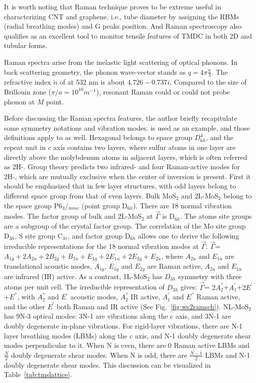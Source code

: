 It is worth noting that Raman technique proves to be extreme useful in characterizing CNT and graphene, i.e., tube diameter by assigning the RBMs (radial breathing modes) and G peaks position.\cite{Bonaccorso2013} And Raman spectroscopy also qualifies as an excellent tool to monitor tensile features of TMDC in both 2D and tubular forms.\cite{Tang2013} 

Raman spectra arise from the inelastic light scattering of optical phonons. In back scattering geometry, the phonon wave-vector stands as $q = 4\pi\frac{n}{\lambda}$. The refractive index $\tilde{n}$ of  at 532 nm is about $4.726 - 0.737i$. Compared to the size of Brillouin zone ($\pi/a = 10^{10}m^{-1}$), resonant Raman could or could not probe phonon at $M$ point.

Before discussing the Raman spectra features, the author briefly recapitulate some symmetry notations and vibration modes.  is used as an example, and those definitions apply to  as well. Hexagonal  belongs to space group $D_{6h}^4$, and the repeat unit in $c$ axis contains two layers, where sulfur atoms in one layer are directly above the molybdenum atoms in adjacent layers, which is often referred as 2H-. Group theory predicts two infrared- and four Raman-active modes for 2H-, which are mutually exclusive when the center of inversion is present. First it should be emphasized that in few layer structures,  with odd layers belong to different space group from that of even layers. Bulk MoS$_2$ and 2L-MoS$_2$ belong to the space group P6$_3$/$_{mmc}$ (point group D$_{6h}$). There are 18 normal vibration modes. The factor group of bulk and 2L-MoS$_2$ at $\vec{\Gamma}$ is D$_{6h}$. The atoms site groups are a subgroup of the crystal factor group. The correlation of the Mo site group D$_{3h}$, S site group C$_{3v}$, and factor group D$_{6h}$ allows one to derive the following irreducible representations for the 18 normal vibration modes at $\vec{\Gamma}$: $\vec{\Gamma}$= $A_{1g}+2A_{2u}+2B_{2g}+B_{1u}+E_{1g}+2E_{1u}+2E_{2g}+E_{2u}$, where $A_{2u}$ and $E_{1u}$ are translational acoustic modes, $A_{1g}$, $E_{1g}$ and $E_{2g}$ are Raman active, $A_{2u}$ and $E_{1u}$ are infrared (IR) active. As a contrast, 1L-MoS$_2$ has $D_{3h}$ symmetry with three atoms per unit cell. The irreducible representation of $D_{3h}$ gives: $\vec{\Gamma}$= $2A_2^{''}$+$A_1^{'}$+$2E^{'}$+$E^{''}$, with $A_2^{''}$ and $E^{'}$ acoustic modes, $A_2^{''}$ IR active, $A_1^{'}$ and $E^{''}$ Raman active, and the other $E^{'}$ both Raman and IR active (See Fig.~\ref{fig:ws2ramsch}). NL-MoS$_2$ has 9N-3 optical modes: 3N-1 are vibrations along the c axis, and 3N-1 are doubly degenerate in-plane vibrations. For rigid-layer vibrations, there are N-1 layer breathing modes (LBMs) along the c axis, and N-1 doubly degenerate shear modes perpendicular to it. When N is even, there are 0 Raman active LBMs and $\frac{N}{2}$ doubly degenerate shear modes. When N is odd, there are $\frac{N-1}{2}$ LBMs and N-1 doubly degenerate shear modes.\cite{Wieting1971,Zhang2013e} This discussion can be visualized in Table~\ref{tab:tmslattice}.

